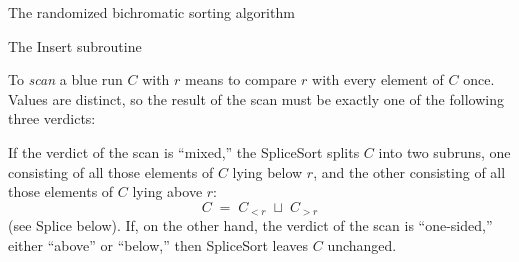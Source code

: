 \documentclass[11pt]{article}
\theoremstyle{definition}
\numberwithin{equation}{section}
\begin{document}
\begin{section}{The randomized bichromatic sorting algorithm}
\begin{subsection}{The {\ttfamily Insert} subroutine}
\begin{aiblock}
To {\em scan} a blue run $C$ with $r$ means to compare $r$ with
every element of $C$ once. Values are distinct, so the result of the scan must be exactly one of the following three verdicts:
If the verdict of the scan is ``mixed,'' the {\ttfamily SpliceSort} splits
$C$ into two subruns, one consisting of all those elements of $C$ lying below $r$, and the other consisting of all those elements of $C$ lying above $r$:
$$
C\;=\;C_{<r}\;\sqcup\;C_{>r}
$$
(see {\ttfamily Splice} below).
If, on the other hand, the verdict of the scan is ``one-sided,'' either ``above'' or ``below,''
then {\ttfamily SpliceSort} leaves $C$ unchanged.


\end{aiblock}
\end{subsection}
\end{section}
\end{document}
